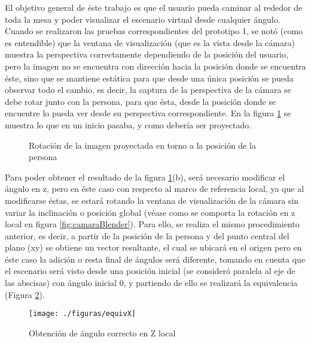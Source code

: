 \documentclass[a4paper,openright,12pt]{report}
\begin{document}
El objetivo general de éste trabajo es que el usuario pueda caminar al rededor de toda la mesa y poder visualizar el escenario virtual desde cualquier ángulo. Cuando se realizaron las pruebas correspondientes del prototipo 1, se notó (como es entendible) que la ventana de visualización (que es la vista desde la cámara) muestra la perspectiva correctamente dependiendo de la posición del usuario, pero la imagen no se encuentra con dirección hacia la posición donde se encuentra éste, sino que se mantiene estática para que desde una única posición se pueda observar todo el cambio, es decir, la captura de la perspectiva de la cámara se debe rotar junto con la persona, para que ésta, desde la posición donde se encuentre lo pueda ver desde su perspectiva correspondiente. En la figura \ref{fig:vistas} se muestra lo que en un inicio pasaba, y como debería ser proyectado.\\
\begin{figure}[thb]
	\centering
	\hspace*{1cm}
	\caption{Rotación de la imagen proyectada en torno a la posición de la persona} \label{fig:vistas}
\end{figure}
Para poder obtener el resultado de la figura \ref{fig:vistas}(b), será necesario modificar el ángulo en z, pero en éste caso con respecto al marco de referencia local, ya que al modificarse éstas, se estará rotando la ventana de visualización de la cámara sin variar la inclinación o posición global (véase como se comporta la rotación en z local en figura \ref{fig:camaraBlender}). Para ello, se realiza el mismo procedimiento anterior, es decir, a partir de la posición de la persona y del punto central del plano (xy) se obtiene un vector resultante, el cual se ubicará en el origen pero en éste caso la adición o resta final de ángulos será diferente, tomando en cuenta que el escenario será visto desde una posición inicial (se consideró paralela al eje de las abscisas) con ángulo inicial 0, y partiendo de ello se realizará la equivalencia (Figura \ref{fig:equivX}).
\vspace*{5mm}
\begin{figure}[H]
	\centering
	\texttt{[image: ./figuras/equivX]}
	\caption{Obtención de ángulo correcto en Z local} \label{fig:equivX}
\end{figure}
\end{document}

